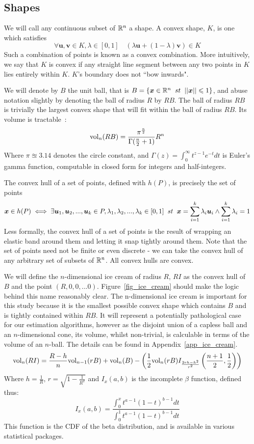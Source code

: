 \subsection{Shapes}

We will call any continuous subset of $\mathbb{R}^{n}$ a shape. A convex shape, $K$, is one which satisfies
$$
\forall \bm{u}, \bm{v} \in K, \lambda \in [0,1] \quad (\lambda \bm{u} + (1-\lambda) \bm{v}) \in K
$$
Such a combination of points is known as a convex combination. More intuitively, we say that $K$ is convex if any straight line segment between any two points in $K$ lies entirely within $K$. $K$'s boundary does not ``bow inwards".

We will denote by $B$ the unit ball, that is $B= \{\bm{x} \in \mathbb{R}^n \;\; st \;\; ||\bm{x}|| \leqslant 1\}$, and abuse notation slightly by denoting the ball of radius $R$ by $RB$. The ball of radius $RB$ is trivially the largest convex shape that will fit within the ball of radius $RB$. Its volume is tractable~\cite{mathworld_ball}:
$$
\mbox{vol}_n(RB) = \frac{\pi^{\frac{n}{2}}}{\Gamma(\frac{n}{2}+1)}R^n
$$
Where $\pi \approxeq 3.14$ denotes the circle constant, and $\Gamma(z) = \int^\infty_0 t^{z-1}e^{-t} dt$ is Euler's gamma function, computable in closed form for integers and half-integers.

The convex hull of a set of points, defined with $h(P)$, is precisely the set of points
$$
\bm{x} \in h(P) \iff \exists \bm{u}_1, \bm{u}_2,...,\bm{u}_k \in P, \lambda_1, \lambda_2, ..., \lambda_k  \in [0,1] \;\; st \;\; \bm{x} = \sum^{k}_{i=1} \lambda_i \bm{u}_i \wedge \sum^{k}_{i=1} \lambda_i = 1
$$
Less formally, the convex hull of a set of points is the result of wrapping an elastic band around them and letting it snap tightly around them. Note that the set of points need not be finite or even discrete - we can take the convex hull of any arbitrary set of subsets of $\mathbb{R}^n$. All convex hulls are convex.

We will define the $n$-dimensional ice cream of radius $R$, $RI$ as the convex hull of $B$ and the point $(R,0,0,...0)$. Figure~\ref{fig_ice_cream} should make the logic behind this name reasonably clear. The n-dimensional ice cream is important for this study because it is the smallest possible convex shape which contains $B$ and is tightly contained within $RB$. It will represent a potentially pathological case for our estimation algorithms, however as the disjoint union of a capless ball and an $n$-dimensional cone, its volume, whilst non-trivial, is calculable in terms of the volume of an $n$-ball. The details can be found in Appendix~\ref{app_ice_cream}.
$$
\mbox{vol}_n(RI) = \frac{R-h}{n} \mbox{vol}_{n-1}(rB) + \mbox{vol}_n(B) - \left(\frac{1}{2}\mbox{vol}_n(rB) I_{\frac{2rh-h^2}{r^2}}\left(\frac{n+1}{2}, \frac{1}{2}\right)\right)
$$
Where $h = \frac{1}{R}$, $r = \sqrt{1-\frac{1}{R^2}}$ and $I_x(a,b)$ is the incomplete $\beta$ function, defined thus:
$$
I_x(a,b) = \frac{\int^x_0 t^{a-1}(1-t)^{b-1}dt}{\int^1_0 t^{a-1}(1-t)^{b-1} dt}
$$
This function is the CDF of the beta distribution, and is available in various statistical packages.

